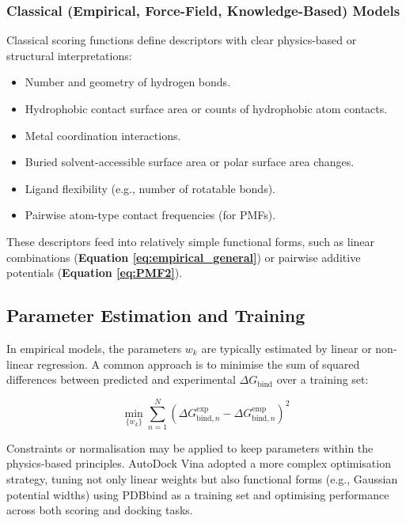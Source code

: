 \documentclass[12pt]{article}
\begin{document}
\subsubsection{Classical (Empirical, Force-Field, Knowledge-Based) Models}

Classical scoring functions define descriptors with clear physics-based or structural interpretations:

\begin{itemize}
    \item Number and geometry of hydrogen bonds.
    \item Hydrophobic contact surface area or counts of hydrophobic atom contacts.
    \item Metal coordination interactions.
    \item Buried solvent-accessible surface area or polar surface area changes.
    \item Ligand flexibility (e.g., number of rotatable bonds).
    \item Pairwise atom-type contact frequencies (for PMFs).
\end{itemize}

These descriptors feed into relatively simple functional forms, such as linear combinations (\textbf{Equation \ref{eq:empirical_general}}) or pairwise additive potentials (\textbf{Equation \ref{eq:PMF2}}).

\subsection{Parameter Estimation and Training}

In empirical models, the parameters $w_k$ are typically estimated by linear or non-linear regression. A common approach is to minimise the sum of squared differences between predicted and experimental $\Delta G_{\text{bind}}$ over a training set:

\begin{equation}
    \min_{\{w_k\}} \sum_{n=1}^{N} \left( \Delta G_{\text{bind},n}^{\text{exp}} - \Delta G_{\text{bind},n}^{\text{emp}} \right)^2
\label{eq:parameter_fitting}
\end{equation}

 Constraints or normalisation may be applied to keep parameters within the physics-based principles.
AutoDock Vina adopted a more complex optimisation strategy, tuning not only linear weights but also functional forms (e.g., Gaussian potential widths) using PDBbind as a training set and optimising performance across both scoring and docking tasks\cite{CH3_Trott2010_Vina}.
\end{document}
